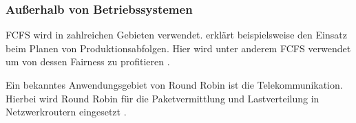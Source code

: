\subsubsection{Außerhalb von Betriebssystemen}
\ac{FCFS} wird in zahlreichen Gebieten verwendet.  erklärt beispielsweise den Einsatz beim Planen von Produktionsabfolgen. Hier wird unter anderem \ac{FCFS} verwendet um von dessen Fairness zu profitieren \Autocite{Groover.2016}.

Ein bekanntes Anwendungsgebiet von Round Robin ist die Telekommunikation. Hierbei wird Round Robin für die Paketvermittlung und Lastverteilung in Netzwerkroutern eingesetzt \Autocite{Kurose.2010}. 
